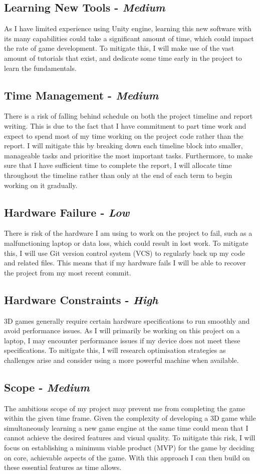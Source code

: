 \documentclass[12pt]{article}
\begin{document}
\subsection{Learning New Tools - \textit{Medium}}
As I have limited experience using Unity engine, learning this new software with its many capabilities could take a significant amount of time, which could impact the rate of game development. To mitigate this, I will make use of the vast amount of tutorials that exist, and dedicate some time early in the project to learn the fundamentals.
\subsection{Time Management - \textit{Medium}}
There is a risk of falling behind schedule on both the project timeline and report writing. This is due to the fact that I have commitment to part time work and expect to spend most of my time working on the project code rather than the report. I will mitigate this by breaking down each timeline block into smaller, manageable tasks and prioritise the most important tasks. Furthermore, to make sure that I have sufficient time to complete the report, I will allocate time throughout the timeline rather than only at the end of each term to begin working on it gradually.
\subsection{Hardware Failure - \textit{Low}}
There is risk of the hardware I am using to work on the project to fail, such as a malfunctioning laptop or data loss, which could result in lost work.  To mitigate this, I will use Git version control system (VCS) to regularly back up my code and related files. This means that if my hardware fails I will be able to recover the project from my most recent commit.
\subsection{Hardware Constraints - \textit{High}}
3D games generally require certain hardware specifications to run smoothly and avoid performance issues. As I will primarily be working on this project on a laptop, I may encounter performance issues if my device does not meet these specifications. To mitigate this, I will research optimisation strategies as challenges arise and consider using a more powerful machine when available. 
\subsection{Scope - \textit{Medium}}
The ambitious scope of my project may prevent me from completing the game within the given time frame. Given the complexity of developing a 3D game while simultaneously learning a new game engine at the same time could mean that I cannot achieve the desired features and visual quality. To mitigate this risk, I will focus on establishing a minimum viable product (MVP) for the game by deciding on core, achievable aspects of the game. With this approach I can then build on these essential features as time allows.
\end{document}
